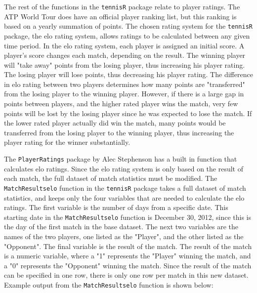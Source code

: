 \documentclass{article}\usepackage[]{graphicx}\usepackage[]{color}
\numberwithin{equation}{section} %
\newcommand{\pkg}[1]{{\texttt{#1}}}
\begin{document}
The rest of the functions in the \pkg{tennisR} package relate to player ratings.  The ATP World Tour does have an official player ranking list, but this ranking is based on a yearly summation of points.  The chosen rating system for the \pkg{tennisR} package, the elo rating system, allows ratings to be calculated between any given time period.  In the elo rating system, each player is assigned an initial score.  A player's score changes each match, depending on the result.  The winning player will "take away" points from the losing player, thus increasing his player rating.  The losing player will lose points, thus decreasing his player rating.  The difference in elo rating between two players determines how many points are "transferred" from the losing player to the winning player.  However, if there is a large gap in points between players, and the higher rated player wins the match, very few points will be lost by the losing player since he was expected to lose the match.  If the lower rated player actually did win the match, many points would be transferred from the losing player to the winning player, thus increasing the player rating for the winner substantially.

The \pkg{PlayerRatings} package by Alec Stephenson has a built in function that calculates elo ratings.  Since the elo rating system is only based on the result of each match, the full dataset of match statistics must be modified.  The \texttt{MatchResultselo} function in the \pkg{tennisR} package takes a full dataset of match statistics, and keeps only the four variables that are needed to calculate the elo ratings.  The first variable is the number of days from a specific date.  This starting date in the \texttt{MatchResultselo} function is December 30, 2012, since this is the day of the first match in the base dataset.  The next two variables are the names of the two players, one listed as the "Player", and the other listed as the "Opponent".  The final variable is the result of the match.  The result of the match is a numeric variable, where a "1" represents the "Player" winning the match, and a "0" represents the "Opponent" winning the match.  Since the result of the match can be specified in one row, there is only one row per match in this new dataset.  Example output from the \texttt{MatchResultselo} function is shown below:
\end{document}
